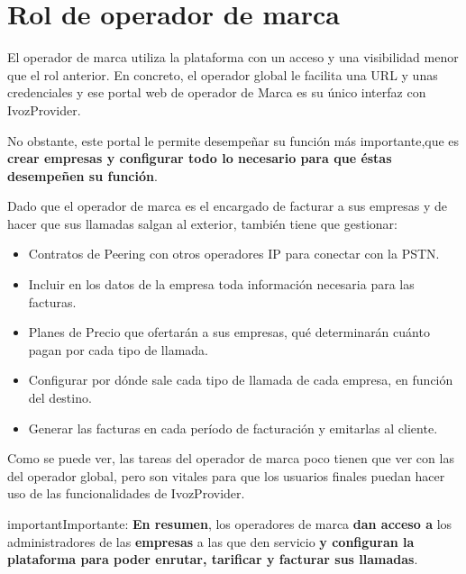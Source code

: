 \documentclass[letterpaper,10pt,spanish]{sphinxmanual}
\begin{document}
\section{Rol de operador de marca}
\label{operation_roles/index:brand-andministator-role}
El operador de marca utiliza la plataforma con un acceso y una visibilidad menor que el rol anterior. En concreto, el operador global le facilita una URL y unas credenciales y ese portal web de operador de Marca es su único interfaz con IvozProvider.

No obstante, este portal le permite desempeñar su función más importante,que es \textbf{crear empresas y configurar todo lo necesario para que éstas desempeñen su función}.

Dado que el operador de marca es el encargado de facturar a sus empresas y de hacer que sus llamadas salgan al exterior, también tiene que gestionar:
\begin{itemize}
\item {} 
Contratos de Peering con otros operadores IP para conectar con la PSTN.

\item {} 
Incluir en los datos de la empresa toda información necesaria para las facturas.

\item {} 
Planes de Precio que ofertarán a sus empresas, qué determinarán cuánto pagan por cada tipo de llamada.

\item {} 
Configurar por dónde sale cada tipo de llamada de cada empresa, en función del destino.

\item {} 
Generar las facturas en cada período de facturación y emitarlas al cliente.

\end{itemize}

Como se puede ver, las tareas del operador de marca poco tienen que ver con las del operador global, pero son vitales para que los usuarios finales puedan hacer uso de las funcionalidades de IvozProvider.
\label{operation_roles/index:brand-responsibilities}
\begin{notice}{important}{Importante:}
\textbf{En resumen}, los operadores de marca \textbf{dan acceso a} los administradores de las \textbf{empresas} a las que den servicio \textbf{y configuran la plataforma para poder enrutar, tarificar y facturar sus llamadas}.
\end{notice}
\end{document}
